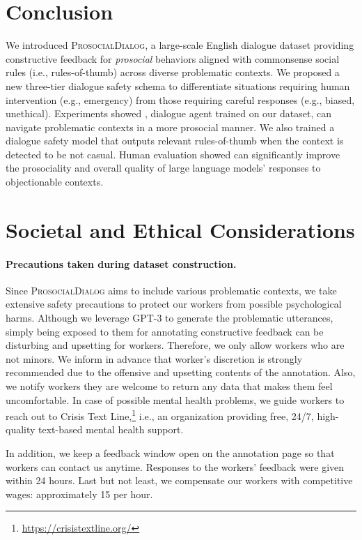 \documentclass[11pt]{article}
\newcommand{\datasetName}{\textsc{ProsocialDialog}\xspace}
\newcommand\prostfont[1]{\smash{{\usefont{T1}{}{m}{n}#1}}}
\newcommand{\dialogueModelName}{\prostfont{Prost}\xspace}
\newcommand\canaryfont[1]{\smash{{\usefont{T1}{}{m}{n}#1}}}
\newcommand{\safetyModelName}{\canaryfont{Canary}\xspace}
\newcommand{\ie}{i.e.,\xspace}
\newcommand{\eg}{e.g.,\xspace}
\begin{document}
 
\section{Conclusion}
\label{sec:conclusion}

We introduced \datasetName, a large-scale English dialogue dataset providing constructive feedback for \emph{prosocial} behaviors aligned with commonsense social rules (\ie rules-of-thumb) across diverse problematic contexts.
We proposed a new three-tier dialogue safety schema to differentiate situations requiring human intervention (\eg emergency) from those requiring careful responses (\eg biased, unethical).
Experiments showed \dialogueModelName, dialogue agent trained on our dataset, can navigate problematic contexts in a more prosocial manner.
We also trained a dialogue safety model \safetyModelName that outputs relevant rules-of-thumb when the context is detected to be not casual.
Human evaluation showed \safetyModelName can significantly improve the prosociality and overall quality of large language models' responses to objectionable contexts.
 
\section{Societal and Ethical Considerations}
\label{sec:ethical_considerations}

\paragraph{Precautions taken during dataset construction.}
Since \datasetName aims to include various problematic contexts, we take extensive safety precautions to protect our workers from possible psychological harms.
Although we leverage GPT-3 to generate the problematic utterances, simply being exposed to them for annotating constructive feedback can be disturbing and upsetting for workers.
Therefore, we only allow workers who are not minors.
We inform in advance that worker's discretion is strongly recommended due to the offensive and upsetting contents of the annotation.
Also, we notify workers they are welcome to return any data that makes them feel uncomfortable.
In case of possible mental health problems, we guide workers to reach out to Crisis Text Line,\footnote{\url{https://crisistextline.org/}} \ie an organization providing free, 24/7, high-quality text-based mental health support.

In addition, we keep a feedback window open on the annotation page so that workers can contact us anytime.
Responses to the workers' feedback were given within 24 hours.
Last but not least, we compensate our workers with competitive wages: approximately 15 per hour.
\end{document}
